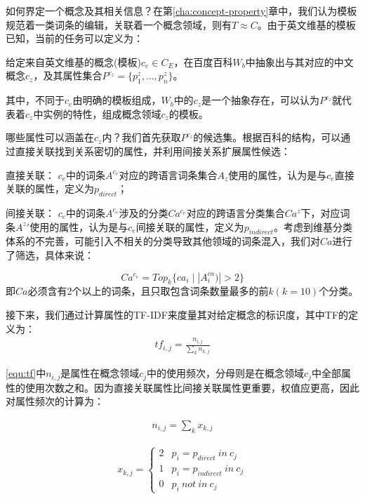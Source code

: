 如何界定一个概念及其相关信息？在第\ref{cha:concept-property}章中，我们认为模板规范着一类词条的编辑，关联着一个概念领域，则有$T \approx C$。由于英文维基的模板已知，当前的任务可以定义为：
\begin{definition}
给定来自英文维基的概念(模板)$c_e \in C_E$，在百度百科$W_b$中抽象出与其对应的中文概念$c_z$，及其属性集合$P^{c_z}=\{p_1^z,...,p_n^z\}$。
\end{definition}
其中，不同于$c_e$由明确的模板组成，$W_b$中的$c_z$是一个抽象存在，可以认为$P^{c_z}$就代表着$c_z$中实例的特性，组成概念领域$c_z$的模板。

哪些属性可以涵盖在$c_z$内？我们首先获取$P^{c_z}$的候选集。根据百科的结构，可以通过直接关联找到关系密切的属性，并利用间接关系扩展属性候选：

{\heiti 直接关联：} $c_e$中的词条$A^{c_e}$对应的跨语言词条集合$A_z$使用的属性，认为是与$c_e$直接关联的属性，定义为$p_{direct}$；

{\heiti 间接关联：} $c_e$中的词条$A^{c_e}$涉及的分类$Ca^{c_e}$对应的跨语言分类集合$Ca^{z}$下，对应词条${A^z}'$使用的属性，认为是与$c_e$间接关联的属性，定义为$p_{indirect}$。考虑到维基分类体系的不完善，可能引入不相关的分类导致其他领域的词条混入，我们对$Ca$进行了筛选，具体来说：

\begin{equation}
Ca^{c_e} = Top_k\{ ca_i\mid |A^{ca}_i)| > 2 \}
\end{equation}
即$Ca$必须含有2个以上的词条，且只取包含词条数量最多的前$k(k=10)$个分类。

接下来，我们通过计算属性的TF-IDF来度量其对给定概念的标识度，其中TF的定义为：
\begin{align}
\label{equ:tf}
tf_{i,j}=\frac{n_{i,j}}{\sum_{k}{n_{k,j}}}
\end{align}

\ref{equ:tf}中$n_{i,j}$是属性在概念领域$c_{j}$中的使用频次，分母则是在概念领域$c_{j}$中全部属性的使用次数之和。因为直接关联属性比间接关联属性更重要，权值应更高，因此对属性频次的计算为：

\begin{align}
n_{i,j} = {\sum_{k}{x_{k,j}}}
\end{align}

\begin{align}
x_{k,j} =
\left\{\begin{matrix}
2 & p_i = p_{direct} \ in \ c_j\\
1 & p_i = p_{indirect} \ in \ c_j\\
0 & p_i \ not \ in \ c_j
\end{matrix}\right.
\end{align}

